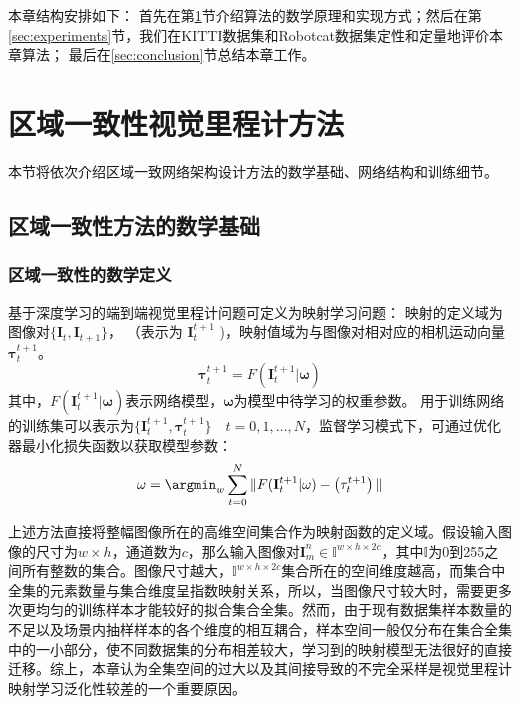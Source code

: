 %
本章结构安排如下：
首先在第\ref{sec:padvo_approach}节介绍算法的数学原理和实现方式；然后在第\ref{sec:experiments}节，我们在KITTI数据集\cite{geiger2012kitti}和Robotcat数据集\cite{RobotCarDatasetIJRR}定性和定量地评价本章算法；
最后在\ref{sec:conclusion}节总结本章工作。


\section{区域一致性视觉里程计方法}
\label{sec:padvo_approach}
%
本节将依次介绍区域一致网络架构设计方法的数学基础、网络结构和训练细节。

\subsection{区域一致性方法的数学基础}
\subsubsection{区域一致性的数学定义}
基于深度学习的端到端视觉里程计问题可定义为映射学习问题：
映射的定义域为图像对$\{\mathbf{I}_t,\mathbf{I}_{t+1}\}$，
（表示为 $\mathbf{I}_t^{t+1}$ )，映射值域为与图像对相对应的相机运动向量$\mathbf{\tau}_t^{t+1}$。
\begin{equation}
  \mathbf{\tau}_t^{t+1} = F(\mathbf{I}_t^{t+1}|\mathbf{\omega})
\end{equation}
其中，$F(\mathbf{I}_t^{t+1}|\mathbf{\omega})$表示网络模型，$\mathbf{\omega}$为模型中待学习的权重参数。
用于训练网络的训练集可以表示为$\{\mathbf{I}_t^{t+1},\mathbf{\tau}_t^{t+1}\}\quad t=0,1,...,N$，监督学习模式下，可通过优化器最小化损失函数以获取模型参数：
\begin{equation}
  \mathbf{\omega} = \argmin_w \sum_{t=0}^N \|F(\mathbf{I}_t^{t+1}|\mathbf{\omega}) - \left(\mathbf{\tau}_t^{t+1}\right)\|
\end{equation}

上述方法直接将整幅图像所在的高维空间集合作为映射函数的定义域。假设输入图像的尺寸为$w\times h$，通道数为$c$，那么输入图像对$\mathbf{I}_m^n \in \mathbb{I}^{w\times h\times 2c}$，其中$\mathbb{I}$为0到255之间所有整数的集合。图像尺寸越大，$\mathbb{I}^{w\times h\times 2c}$集合所在的空间维度越高，而集合中全集的元素数量与集合维度呈指数映射关系，所以，当图像尺寸较大时，需要更多次更均匀的训练样本才能较好的拟合集合全集\cite{lynn2002principles}。然而，由于现有数据集样本数量的不足以及场景内抽样样本的各个维度的相互耦合，样本空间一般仅分布在集合全集中的一小部分，使不同数据集的分布相差较大，学习到的映射模型无法很好的直接迁移。综上，本章认为全集空间的过大以及其间接导致的不完全采样是视觉里程计映射学习泛化性较差的一个重要原因。

